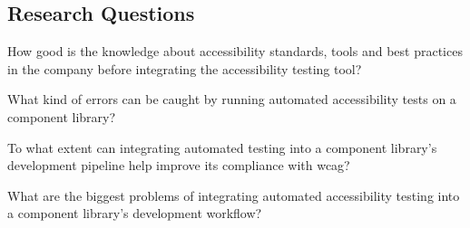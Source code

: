 \documentclass{master_thesis}
\begin{document}
\subsection{Research Questions}

	\begin{RQlist}
		\item How good is the knowledge about accessibility standards, tools and best practices in the company before integrating the accessibility testing tool?
		\item What kind of errors can be caught by running automated accessibility tests on a component library?
		\item To what extent can integrating automated testing into a component library's development pipeline help improve its compliance with \ac{wcag}?
		\item What are the biggest problems of integrating automated accessibility testing into a component library's development workflow?
	\end{RQlist}
\end{document}
